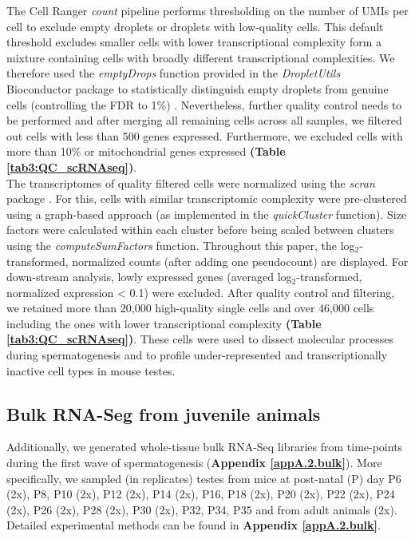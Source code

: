 The Cell Ranger \emph{count} pipeline performs thresholding on the number of UMIs per cell to exclude empty droplets or droplets with low-quality cells. This default threshold excludes smaller cells with lower transcriptional complexity form a mixture containing cells with broadly different transcriptional complexities. We therefore used the \emph{emptyDrops} function provided in the \emph{DropletUtils} Bioconductor package to statistically distinguish empty droplets from genuine cells (controlling the FDR to 1\%) \citep{Lun2018}. Nevertheless, further quality control needs to be performed and after merging all remaining cells across all samples, we filtered out cells with less than 500 genes expressed. Furthermore, we excluded cells with more than 10\% or mitochondrial genes expressed \textbf{(Table \ref{tab3:QC_scRNAseq})}.\\
 
The transcriptomes of quality filtered cells were normalized using the \emph{scran} package \citep{Lun2016pooling}. For this, cells with similar transcriptomic complexity were pre-clustered using a graph-based approach (as implemented in the \emph{quickCluster} function). Size factors were
calculated within each cluster before being scaled between clusters using the \emph{computeSumFactors} function. Throughout this paper, the log$_2$-transformed, normalized counts (after adding one pseudocount) are displayed. For down-stream analysis, lowly expressed genes (averaged log$_2$-transformed, normalized expression < 0.1) were excluded. After quality control and filtering, we retained more than 20,000 high-quality single cells and over 46,000 cells including the ones with lower transcriptional complexity \textbf{(Table \ref{tab3:QC_scRNAseq})}. These cells were used to dissect molecular processes during spermatogenesis and to profile under-represented and transcriptionally inactive cell types in mouse testes. 

\subsection{Bulk RNA-Seg from juvenile animals}

Additionally, we generated whole-tissue bulk RNA-Seq libraries from time-points during the first wave of spermatogenesis (\textbf{Appendix \ref{appA.2.bulk}}). More specifically, we sampled (in replicates) testes from mice at post-natal (P) day P6 (2x), P8, P10 (2x), P12 (2x), P14 (2x), P16, P18 (2x), P20 (2x), P22 (2x), P24 (2x), P26 (2x), P28 (2x), P30 (2x), P32, P34, P35 and from adult animals (2x). Detailed experimental methods can be found in \textbf{Appendix \ref{appA.2.bulk}}. 
\\

